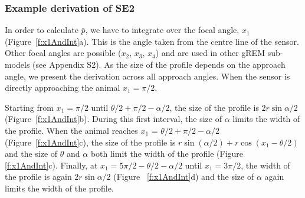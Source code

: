 \documentclass[a4paper,10pt,reqno,oneside]{amsart}
\begin{document}
\subsubsection*{Example derivation of SE2}

In order to calculate $\bar{p}$, we have to integrate over the focal angle, $x_1$ (Figure~\ref{f:x1AndInt}a). This is the angle taken from the centre line of the sensor. Other focal angles are possible ($x_2$, $x_3$, $x_4$) and are used in other gREM sub-models (see Appendix S2). As the size of the profile depends on the approach angle, we present the derivation across all approach angles. When the sensor is directly approaching the animal $x_1  = \pi/2$.

Starting from $x_1 = \pi/2$ until $\theta/2 + \pi/2 - \alpha/2$, the size of the profile is $2r\sin \alpha/2$ (Figure~\ref{f:x1AndInt}b). During this first interval, the size of $\alpha$ limits the width of the profile. When the animal reaches $x_1$  = $\theta/2 + \pi/2 - \alpha/2$ (Figure~\ref{f:x1AndInt}c), the size of the profile is $r\sin( \alpha/2) + r\cos( x_1  - \theta/2)$ and the size of $\theta$ and $\alpha$ both limit the width of the profile (Figure~ \ref{f:x1AndInt}c). Finally, at $x_1  = 5\pi/2 - \theta/2  - \alpha/2$ until $x_1  = 3\pi/2$, the width of the profile is again $2r\sin\alpha/2$ (Figure~ \ref{f:x1AndInt}d) and the size of $\alpha$ again limits the width of the profile. 

\end{document}
